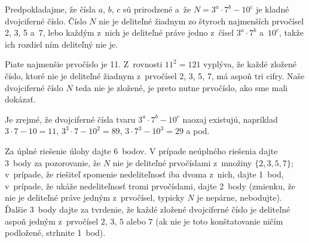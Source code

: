 {%
Predpokladajme, že čísla $a$, $b$, $c$ sú prirodzené a~že
$N=3^a\cdot7^b-10^c$ je kladné dvojciferné číslo. Číslo $N$
nie je deliteľné žiadnym zo štyroch najmenších prvočísel 2, 3, 5 a~7, lebo každým z~nich je deliteľné práve jedno z~čísel $3^a\cdot7^b$ a~$10^c$, takže ich rozdiel ním deliteľný nie je.

Piate najmenšie prvočíslo je 11. Z~rovnosti $11^2=121$ vyplýva, že každé zložené číslo, ktoré nie je deliteľné žiadnym
z~prvočísel 2, 3, 5, 7, má aspoň tri cifry.
Naše dvojciferné číslo $N$ teda nie je zložené, je preto nutne prvočíslo, ako sme mali dokázať.

\Pozn
Je zrejmé, že dvojciferné čísla tvaru $3^a\cdot7^b-10^c$ naozaj existujú, napríklad $3\cdot7-10=11$, $3^3\cdot7-10^2=89$, $3\cdot7^3-10^3=29$ a pod.

\schemaABC
Za úplné riešenie úlohy dajte 6~bodov. V prípade neúplného riešenia dajte 3~body za pozorovanie, že $N$ nie je deliteľné prvočíslami z~množiny $\{2,3,5,7\}$; v~prípade, že riešiteľ spomenie nedeliteľnosť iba dvoma z~nich, dajte 1~bod, v~prípade, že ukáže nedeliteľnosť tromi prvočíslami, dajte 2~body (zmienku, že nie je deliteľné práve jedným z~prvočísel, typicky $N$ je nepárne, nebodujte). Ďalšie 3~body dajte za tvrdenie, že každé zložené dvojciferné číslo je deliteľné aspoň jedným z~prvočísel $2$, $3$, $5$ alebo $7$
(ak nie je toto konštatovanie ničím podložené, strhnite 1~bod).
\endschema
}


